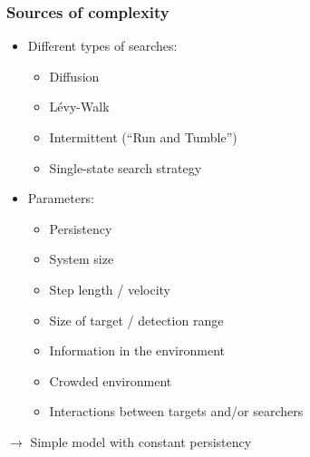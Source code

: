 \documentclass[11pt]{beamer}
\begin{document}
\begin{frame}
 \frametitle{Sources of complexity}
 \begin{itemize}
  \item Different types of searches:
  \begin{itemize}
   \item Diffusion
   \item Lévy-Walk
   \item Intermittent (``Run and Tumble'')
   \item Single-state search strategy
  \end{itemize}
  \item Parameters:
   \begin{itemize}
  \item Persistency
  \item System size
  \item Step length / velocity
  \item Size of target / detection range
  \item Information in the environment
  \item Crowded environment
  \item Interactions between targets and/or searchers
 \end{itemize}
 \end{itemize}
\vspace{0.5cm}
\huge$\rightarrow$ \normalsize Simple model with constant persistency
\end{frame}
\end{document}
